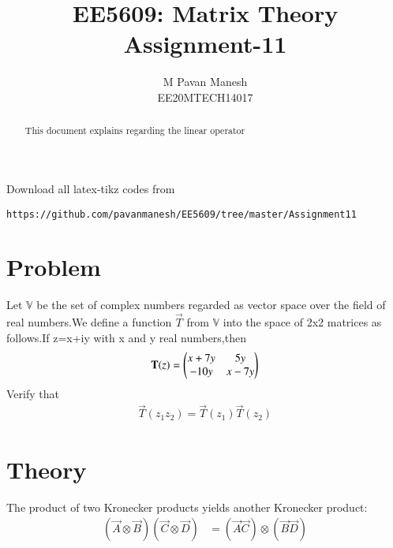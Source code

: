 \documentclass[journal,12pt,twocolumn]{IEEEtran}
\begin{document}
     \def\rightbox#1{\makebox[0in][r]{#1}}
     \def\centbox#1{\makebox[0in]{#1}}
     \def\topbox#1{\raisebox{-\baselineskip}[0in][0in]{#1}}
     \def\midbox#1{\raisebox{-0.5\baselineskip}[0in][0in]{#1}}
\vspace{3cm}
\title{EE5609: Matrix Theory\\
          Assignment-11\\}
\author{M Pavan Manesh\\
EE20MTECH14017 }
\maketitle
\newpage
\bigskip
\renewcommand{\thefigure}{\theenumi}
\renewcommand{\thetable}{\theenumi}
\begin{abstract}
This document explains regarding the linear operator
\end{abstract}
Download all latex-tikz codes from 
%
\begin{lstlisting}
https://github.com/pavanmanesh/EE5609/tree/master/Assignment11
\end{lstlisting}
%
\section{Problem}
Let $\mathbb{V}$ be the set of complex numbers regarded as vector space over the field of real numbers.We define a function $\vec{T}$ from $\mathbb{V}$ into the space of 2x2 matrices as follows.If z=x+iy with x and y real numbers,then 
\begin{align}
    \mathbf{T}(z)=\begin{pmatrix}x+7y&5y\\-10y&x-7y\end{pmatrix}\label{eq:1}
\end{align}
Verify that
\begin{align}
    \vec{T}(z_1z_2)=\vec{T}(z_1)\vec{T}(z_2) \label{eq:1.1}
\end{align}
\section{Theory}
The product of two Kronecker products yields another Kronecker product:
\begin{align}
    (\vec{A} \otimes\vec{B}) (\vec{C} \otimes\vec{D})&=
    (\vec{A} \vec{C})\otimes (\vec{B} \vec{D}) \label{eq:eq_th}
\end{align}
\end{document}
